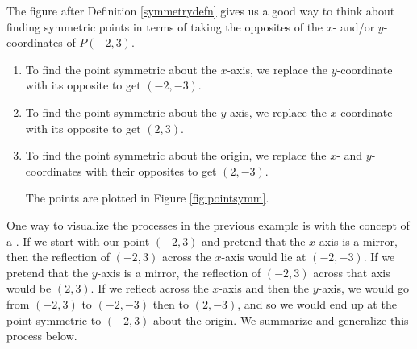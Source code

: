 {
The figure after Definition \ref{symmetrydefn} gives us a good way to think about finding symmetric points in terms of taking the opposites of the $x$- and/or $y$-coordinates of $P(-2,3)$.

\begin{enumerate}

\item  To find the point symmetric about the $x$-axis, we replace the $y$-coordinate with its opposite to get  $(-2,-3)$.

\item  To find the point symmetric about the $y$-axis, we replace the $x$-coordinate with its opposite to get $(2,3)$.

\item  To find the point symmetric about the origin, we replace the $x$- and $y$-coordinates with their opposites to get $(2,-3)$.

The points are plotted in Figure \ref{fig:pointsymm}.

\end{enumerate}



}


\medskip

One way to visualize the processes in the previous example is with the concept of a  .  If we start with our point $(-2,3)$ and pretend that the $x$-axis is a mirror, then the reflection of $(-2,3)$ across the $x$-axis would lie at $(-2,-3)$.  If we pretend that the $y$-axis is a mirror, the reflection of $(-2,3)$ across that axis would be $(2,3)$.  If we reflect across the $x$-axis and then the $y$-axis, we would go from $(-2,3)$ to $(-2,-3)$ then to $(2,-3)$, and so we would end up at the point symmetric to $(-2,3)$ about the origin.  We summarize and generalize this process below.

